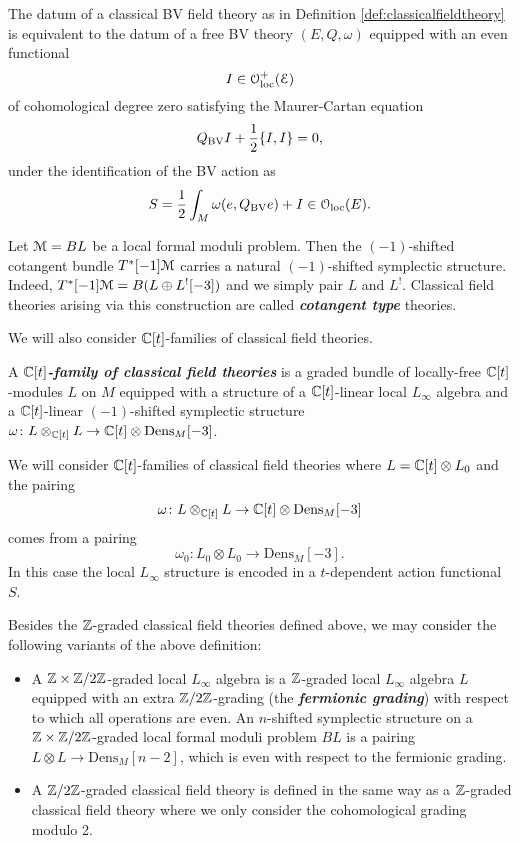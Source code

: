 \documentclass[10pt, oneside]{article}
\newcommand{\Dens}{\mathrm{Dens}}
\newcommand{\defterm}[1]{\textbf{\emph{#1}}}
\begin{document}
The datum of a classical BV field theory as in Definition \ref{def:classicalfieldtheory} is equivalent to the datum of a free BV theory $(E, Q, \omega)$ equipped with an even functional
\[I \in \mathcal{O}_{\rm loc}^+(\mathcal E)\]
of cohomological degree zero satisfying the Maurer-Cartan equation
\[Q_{\mathrm{BV}} I + \frac{1}{2} \{I,I\} = 0,\]
under the identification of the BV action as
\[S = \frac{1}{2} \int_M \omega(e, Q_{\mathrm{BV}} e) + I\in \mathcal{O}_{\rm loc}(E).\]

\begin{example} \label{def:cotangent_type}
Let $\mathcal M=BL$ be a local formal moduli problem. Then the $(-1)$-shifted cotangent bundle $T^*[-1]\mathcal M$ carries a natural $(-1)$-shifted symplectic structure. Indeed, $T^*[-1]\mathcal M = B(L\oplus L^![-3])$ and we simply pair $L$ and $L^!$. Classical field theories arising via this construction are called \defterm{cotangent type} theories.
\end{example}

We will also consider $\mathbb C[t]$-families of classical field theories.
\begin{definition} \label{family_of_BV_theories_def}
A \defterm{$\mathbb C[t]$-family of classical field theories} is a graded bundle of locally-free $\mathbb C[t]$-modules $L$ on $M$ equipped with a structure of a $\mathbb C[t]$-linear local $L_\infty$ algebra and a $\mathbb C[t]$-linear $(-1)$-shifted symplectic structure $\omega\colon L\otimes_{\CC[t]} L\rightarrow \CC[t]\otimes \Dens_M[-3]$.
\end{definition}

We will consider $\mathbb C[t]$-families of classical field theories where $L = \mathbb C[t]\otimes L_0$ and the pairing
\[\omega\colon L\otimes_{\CC[t]} L\rightarrow \CC[t]\otimes \Dens_M[-3]\]
comes from a pairing
\[\omega_0\colon L_0\otimes L_0\rightarrow \Dens_M[-3].\]
In this case the local $L_\infty$ structure is encoded in a $t$-dependent action functional $S$.

\begin{remark}
Besides the $\mathbb Z$-graded classical field theories defined above, we may consider the following variants of the above definition:
\begin{itemize}
\item A $\mathbb Z\times \mathbb Z/2\mathbb Z$-graded local $L_\infty$ algebra is a $\mathbb Z$-graded local $L_\infty$ algebra $L$ equipped with an extra $\mathbb Z/2\mathbb Z$-grading (the \defterm{fermionic grading}) with respect to which all operations are even. An $n$-shifted symplectic structure on a $\mathbb Z\times\mathbb Z/2\mathbb Z$-graded local formal moduli problem $BL$ is a pairing $L\otimes L\rightarrow \Dens_M[n-2]$, which is even with respect to the fermionic grading.

\item A $\mathbb Z/2\mathbb Z$-graded classical field theory is defined in the same way as a $\mathbb Z$-graded classical field theory where we only consider the cohomological grading modulo 2.
\end{itemize}
\end{remark}
\end{document}
